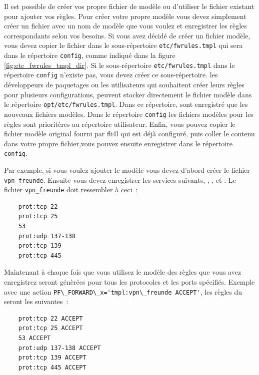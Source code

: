 Il est possible de créer vos propre fichier de modèle ou d'utiliser le fichier
existant pour ajouter vos règles. Pour créer votre propre modèle vous devez
simplement créer un fichier avec un nom de modèle que vous voulez et enregistrer
les règles correspondants selon vos besoins. Si vous avez décidé de créer un
fichier modèle, vous devez copier le fichier dans le sous-répertoire
\verb+etc/fwrules.tmpl+ qui sera dans le répertoire \texttt{config}, comme
indiqué dans la figure \ref{fig:etc_fwrules_tmpl_dir}. Si le sous-répertoire
\texttt{etc/fwrules.tmpl} dans le répertoire \texttt{config} n'existe pas,
vous devez créer ce sous-répertoire. les développeurs de paquetages ou les
utilisateurs qui souhaitent créer leurs règles pour plusieurs configurations,
peuvent stocker directement le fichier modèle dans le répertoire
\texttt{opt/etc/fwrules.tmpl}. Dans ce répertoire, sont enregistré que les
nouveaux fichiers modèles. Dans le répertoire \texttt{config} les fichiers
modèles pour les règles sont prioritères au répertoire utilisateur. Enfin, vous
pouvez copier le fichier modèle original fourni par fli4l qui est déjà
\flqq{}configuré\frqq{}, puis coller le contenu dans votre propre fichier,vous
pouvez ensuite enregistrer dans le répertoire \texttt{config}.

Par exemple, si vous voulez ajouter le modèle  vous devez
d'abord créer le fichier \texttt{vpn\_freunde}. Ensuite vous devez enregistrer
les services suivants, , ,  et
. Le fichier \texttt{vpn\_freunde} doit ressembler à ceci~:

\begin{example}
\begin{verbatim}
    prot:tcp 22
    prot:tcp 25
    53
    prot:udp 137-138
    prot:tcp 139
    prot:tcp 445
\end{verbatim}
\end{example}

\noindent Maintenant à chaque fois que vous utilisez le modèle 
des règles que vous avez enregistrez seront génèrées pour tous les protocoles
et les ports spécifiés. Exemple avec une action \verb+PF\_FORWARD\_x='tmpl:vpn\_freunde ACCEPT'+,
les règles du  seront les suivantes~:

\begin{example}
\begin{verbatim}
    prot:tcp 22 ACCEPT
    prot:tcp 25 ACCEPT
    53 ACCEPT
    prot:udp 137-138 ACCEPT
    prot:tcp 139 ACCEPT
    prot:tcp 445 ACCEPT
\end{verbatim}
\end{example}

